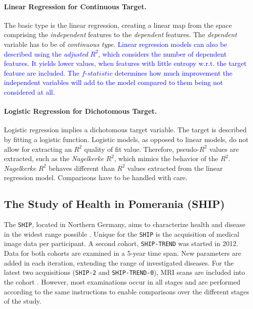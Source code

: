 \documentclass[journal]{style/vgtc} 			          %
\newcommand{\add}[1]{\textcolor{blue}{#1}}
\begin{document}
\paragraph{Linear Regression for Continuous Target.}
The basic type is the linear regression, creating a linear map from the space comprising the \emph{independent} features to the \emph{dependent} features.
The \emph{dependent} variable has to be of \emph{continuous type}.
\add{
Linear regression models can also be described using the \emph{adjusted} $R^2$, which considers the number of dependent features.
It yields lower values, when features with little entropy w.r.t. the target feature are included.
The $f$-$statistic$ determines how much improvement the independent variables will add to the model compared to them being not considered at all.
}

\paragraph{Logistic Regression for Dichotomous Target.} Logistic regression implies a dichotomous target variable.
The target is described by fitting a logistic function.
Logistic models, as opposed to linear models, do not allow for extracting an $R^2$ quality of fit value.
Therefore, pseudo-$R^2$ values are extracted, such as the \emph{Nagelkerke $R^2$}, which mimics the behavior of the $R^2$.
\emph{Nagelkerke $R^2$} behaves different than $R^2$ values extracted from the linear regression model.
Comparisons have to be handled with care.
\subsection{The Study of Health in Pomerania (SHIP)}
The \texttt{SHIP}, located in Northern Germany, aims to characterize health and disease in the widest range possible \cite{Volzke2011}.
Unique for the \texttt{SHIP} is the acquisition of medical image data per participant.
A second cohort, \texttt{SHIP-TREND} was started in 2012.
Data for both cohorts are examined in a 5-year time span.
New parameters are added in each iteration, extending the range of investigated diseases.
For the latest two acquisitions (\texttt{SHIP-2} and \texttt{SHIP-TREND-0}), MRI scans are included into the cohort \cite{Hegenscheid2009, Ivanovska2014}.
However, most examinations occur in all stages and are performed according to the same instructions to enable comparisons over the different stages of the study.
\end{document}
